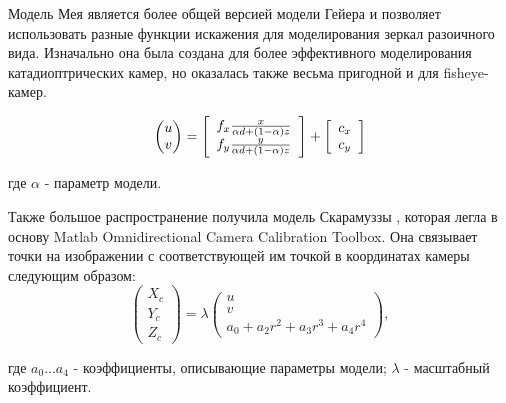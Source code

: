 Модель Мея \cite{mei} является более общей версией модели Гейера \cite{geyer} и позволяет использовать разные 
функции искажения для моделирования зеркал разоичного вида. Изначально она была создана для более 
эффективного моделирования катадиоптрических камер, но оказалась также весьма пригодной и для fisheye-камер. 

\begin{equation}
    \vspace{12pt}
    \begin{pmatrix}u\\v\end{pmatrix}=\left[\begin{array}{l}
	f_{x} \frac{x}{\alpha d+(1-\alpha) z} \\
	f_{y} \frac{y}{\alpha d+(1-\alpha) z}
	\end{array}\right]+\left[\begin{array}{l}
	c_{x} \\
	c_{y}
	\end{array}\right]
    \vspace{12pt}
\end{equation}

где $\alpha$ - параметр модели. 

Также большое распространение получила модель Скарамуззы \cite{scaramuzza}, которая легла в основу Matlab Omnidirectional 
Camera Calibration Toolbox. Она связывает точки на изображении с соответствующей им точкой в координатах камеры
следующим образом:
\vskip 12pt
\begin{equation}	
    \begin{pmatrix}X_c\\Y_c\\Z_c\end{pmatrix} = \lambda \begin{pmatrix}u\\v\\a_0 + a_2 r^2 + a_3 r^3 + a_4 r^4\end{pmatrix},
    \label{eqn:scaramuzza} 
\end{equation}
\vskip 24pt

\noindent где $a_0 ... a_4$ - коэффициенты, описывающие параметры модели; $\lambda$ - масштабный коэффициент.

